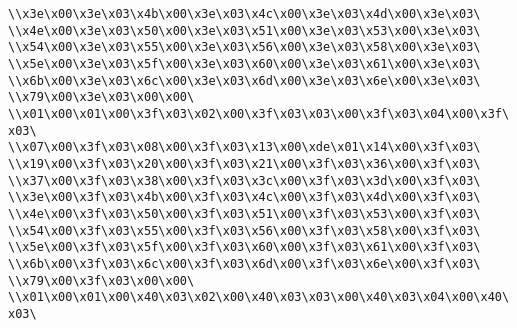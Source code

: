 \verb|\\x3e\x00\x3e\x03\x4b\x00\x3e\x03\x4c\x00\x3e\x03\x4d\x00\x3e\x03\|\newline
\verb|\\x4e\x00\x3e\x03\x50\x00\x3e\x03\x51\x00\x3e\x03\x53\x00\x3e\x03\|\newline
\verb|\\x54\x00\x3e\x03\x55\x00\x3e\x03\x56\x00\x3e\x03\x58\x00\x3e\x03\|\newline
\verb|\\x5e\x00\x3e\x03\x5f\x00\x3e\x03\x60\x00\x3e\x03\x61\x00\x3e\x03\|\newline
\verb|\\x6b\x00\x3e\x03\x6c\x00\x3e\x03\x6d\x00\x3e\x03\x6e\x00\x3e\x03\|\newline
\verb|\\x79\x00\x3e\x03\x00\x00\|\newline
\verb|\\x01\x00\x01\x00\x3f\x03\x02\x00\x3f\x03\x03\x00\x3f\x03\x04\x00\x3f\x03\|\newline
\verb|\\x07\x00\x3f\x03\x08\x00\x3f\x03\x13\x00\xde\x01\x14\x00\x3f\x03\|\newline
\verb|\\x19\x00\x3f\x03\x20\x00\x3f\x03\x21\x00\x3f\x03\x36\x00\x3f\x03\|\newline
\verb|\\x37\x00\x3f\x03\x38\x00\x3f\x03\x3c\x00\x3f\x03\x3d\x00\x3f\x03\|\newline
\verb|\\x3e\x00\x3f\x03\x4b\x00\x3f\x03\x4c\x00\x3f\x03\x4d\x00\x3f\x03\|\newline
\verb|\\x4e\x00\x3f\x03\x50\x00\x3f\x03\x51\x00\x3f\x03\x53\x00\x3f\x03\|\newline
\verb|\\x54\x00\x3f\x03\x55\x00\x3f\x03\x56\x00\x3f\x03\x58\x00\x3f\x03\|\newline
\verb|\\x5e\x00\x3f\x03\x5f\x00\x3f\x03\x60\x00\x3f\x03\x61\x00\x3f\x03\|\newline
\verb|\\x6b\x00\x3f\x03\x6c\x00\x3f\x03\x6d\x00\x3f\x03\x6e\x00\x3f\x03\|\newline
\verb|\\x79\x00\x3f\x03\x00\x00\|\newline
\verb|\\x01\x00\x01\x00\x40\x03\x02\x00\x40\x03\x03\x00\x40\x03\x04\x00\x40\x03\|\newline
